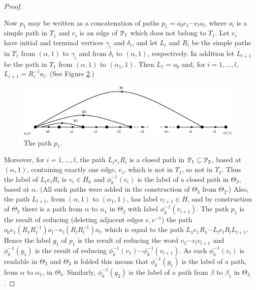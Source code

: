 \documentclass[a4paper,12pt]{article}
\renewcommand{\a}{\alpha }
\renewcommand{\b}{\beta }
\newcommand{\g}{\gamma }
\renewcommand{\d}{\delta }
\newcommand{\T}{\Theta }
\newcommand{\U}{\Upsilon }
\newcommand{\cP}{{\cal{P}}}
\numberwithin{equation}{section}
\numberwithin{figure}{section}
\begin{document}
\begin{proof}
\begin{figure}
\label{fig:nf-1}
\end{figure}
Now $p_1$ may
be written as a concatenation of paths $p_1=o_0e_1\cdots e_l o_{l}$,
where $o_i$ is a simple path in $\U_1$ and $e_i$ is an edge of $\cP_1$ which does
not belong to $\U_1$.  Let $e_i$ have initial and terminal vertices
$\g_i$ and $\d_i$, and let $L_i$ and $R_i$ be the simple paths in $\U_1$ from
$(\a,1)$ to $\g_i$ and from $\d_i$ to $(\a,1)$, respectively.
In addition let $L_{l+1}$ be the path in $\U_1$ from $(\a,1)$ to
$(\a_1,1)$.
Then $L_1=o_0$ and, for $i=1,\ldots ,l$, $L_{i+1}=R_i^{-1}o_{i}$.
(See Figure \ref{fig:LeR}.)
\begin{figure}
\begin{center}
\psfrag{(a,1)}{$(\a,1)$}
\psfrag{(a1,1)}{$(\a_1,1)$}
\includegraphics[scale=.4]{LeR.eps}
\end{center}
\caption{The path $p_1$.}
\label{fig:LeR}
\end{figure}
Moreover, for $i=1,\ldots ,l$,
the path $L_i e_i R_i$ is a closed path in $\cP_1\subseteq \cP_2$, based
at $(\a,1)$, containing exactly one edge, $e_i$, which is not in $\U_1$, so not in $\U_2$.
Thus the label of  $L_i e_i R_i$ is $v_i\in H_k$ and $\phi_k^{-1}(v_i)$ is the
label of a closed path in $\T_3$, based at  $\a$. (All such paths
were added in the construction of $\T_3$ from $\T_2$.)
Also, the path $L_{l+1}$, from $(\a,1)$ to $(\a_1,1)$, has
label $v_{l+1}\in H$,
and by construction of $\T_2$ there is a path from $\a$ to
$\a_1$ in $\T_2$ with label $\phi_k^{-1}(v_{l+1})$.
The path
$p_1$ is the result of reducing (deleting adjacent edges $e,e^{-1}$) the path
$o_0 e_1 (R_1 R_1^{-1}) o_1 \cdots e_{l}(R_l R_l^{-1}) o_{l}$, which
is equal to the path $L_1 e_1 R_1 \cdots L_l e_l R_l L_{l+1}$. Hence the label $g_1$
of $p_1$ is the result of
reducing the word $v_1\cdots v_l v_{l+1}$
 and $\phi_k^{-1}(g_1)$ is the result of
reducing $\phi_k^{-1}(v_1) \cdots \phi_k^{-1}(v_{l+1})$. As each $\phi_k^{-1}(v_i)$ is readable
in $\T_3$ and $\T_3$ is folded this means  that $\phi_k^{-1}(g_1)$ is the
label of a path, from $\a$ to   $\a_1$, in $\T_3$. Similarly,
$\phi_k^{-1}(g_2)$
is the label of a path from $\b$ to $\b_1$ in $\T_3$.


\end{proof}
\end{document}
